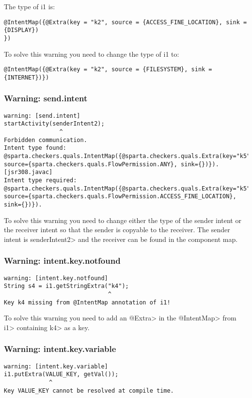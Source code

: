 The type of i1 is: 
\begin{Verbatim}
@IntentMap({@Extra(key = "k2", source = {ACCESS_FINE_LOCATION}, sink = {DISPLAY})
})
\end{Verbatim}

To solve this warning you need to change the type of i1 to:

\begin{Verbatim}
@IntentMap({@Extra(key = "k2", source = {FILESYSTEM}, sink = {INTERNET})})
\end{Verbatim}

\subsubsection{Warning: send.intent}

\begin{Verbatim}
warning: [send.intent] 
startActivity(senderIntent2);
                ^
Forbidden communication. 
Intent type found:
@sparta.checkers.quals.IntentMap({@sparta.checkers.quals.Extra(key="k5",
source={sparta.checkers.quals.FlowPermission.ANY}, sink={})}). 
[jsr308.javac]    
Intent type required:
@sparta.checkers.quals.IntentMap({@sparta.checkers.quals.Extra(key="k5",
source={sparta.checkers.quals.FlowPermission.ACCESS_FINE_LOCATION}, sink={})}). 
\end{Verbatim}

To solve this warning you need to change either the type of the sender intent
or the receiver intent so that the sender is copyable to the receiver. The
sender intent is \<senderIntent2> and the receiver can be found in the component
map.



\subsubsection{Warning: intent.key.notfound}

\begin{Verbatim}
warning: [intent.key.notfound] 
String s4 = i1.getStringExtra("k4");
                              ^
Key k4 missing from @IntentMap annotation of i1!
\end{Verbatim}

To solve this warning you need to add an \<@Extra> in the \<@IntentMap> from
\<i1> containing \<k4> as a key.



\subsubsection{Warning: intent.key.variable}
\begin{Verbatim}
warning: [intent.key.variable] 
i1.putExtra(VALUE_KEY, getVal());
             ^
Key VALUE_KEY cannot be resolved at compile time.
\end{Verbatim}

